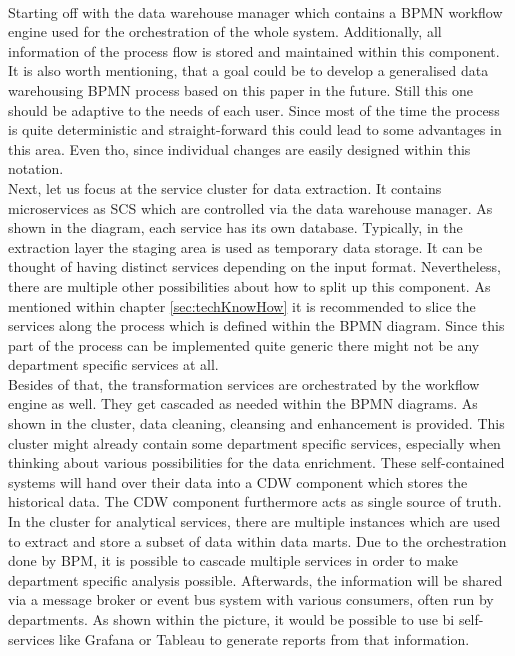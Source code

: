\\
Starting off with the data warehouse manager which contains a BPMN workflow engine used for the orchestration of the whole system. Additionally, all information of the process flow is stored and maintained within this component.\newline
It is also worth mentioning, that a goal could be to develop a generalised data warehousing BPMN process based on this paper in the future.  Still this one should be adaptive to the needs of each user. Since most of the time the process is quite deterministic and straight-forward this could lead to some advantages in this area. Even tho, since individual changes are easily designed within this notation. \newline
\\
Next, let us focus at the service cluster for data extraction. It contains microservices as SCS which are controlled via the data warehouse manager. As shown in the diagram, each service has its own database. Typically, in the extraction layer the staging area is used as temporary data storage.  It can be thought of having distinct services depending on the input format. Nevertheless, there are multiple other possibilities about how to split up this component. As mentioned within chapter \ref{sec:techKnowHow} it is recommended to slice the services along the process which is defined within the BPMN diagram. Since this part of the process can be implemented quite generic there might not be any department specific services at all.\newline
\\
Besides of that, the transformation services are orchestrated by the workflow engine as well. They get cascaded as needed within the BPMN diagrams. As shown in the cluster, data cleaning, cleansing and enhancement is provided. This cluster might already contain some department specific services, especially when thinking about various possibilities for the data enrichment.\newline
These self-contained systems will hand over their data into a CDW component which stores the historical data. The CDW component furthermore acts as single source of truth.\newline
\\
In the cluster for analytical services, there are multiple instances which are used to extract and store a subset of data within data marts. Due to the orchestration done by BPM, it is possible to cascade multiple services in order to make department specific analysis possible. Afterwards, the information will be shared via a message broker or event bus system with various consumers, often run by departments. As shown within the picture, it would be possible to use \acrshort{bi} self-services like Grafana or Tableau to generate reports from that information.\newline
